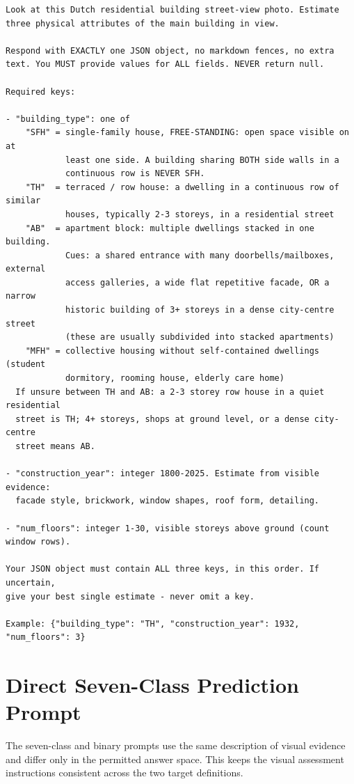 \begin{lstlisting}[keywords={},mathescape=false,basicstyle=\ttfamily\footnotesize,breaklines=true]
Look at this Dutch residential building street-view photo. Estimate three physical attributes of the main building in view.

Respond with EXACTLY one JSON object, no markdown fences, no extra text. You MUST provide values for ALL fields. NEVER return null.

Required keys:

- "building_type": one of
    "SFH" = single-family house, FREE-STANDING: open space visible on at
            least one side. A building sharing BOTH side walls in a
            continuous row is NEVER SFH.
    "TH"  = terraced / row house: a dwelling in a continuous row of similar
            houses, typically 2-3 storeys, in a residential street
    "AB"  = apartment block: multiple dwellings stacked in one building.
            Cues: a shared entrance with many doorbells/mailboxes, external
            access galleries, a wide flat repetitive facade, OR a narrow
            historic building of 3+ storeys in a dense city-centre street
            (these are usually subdivided into stacked apartments)
    "MFH" = collective housing without self-contained dwellings (student
            dormitory, rooming house, elderly care home)
  If unsure between TH and AB: a 2-3 storey row house in a quiet residential
  street is TH; 4+ storeys, shops at ground level, or a dense city-centre
  street means AB.

- "construction_year": integer 1800-2025. Estimate from visible evidence:
  facade style, brickwork, window shapes, roof form, detailing.

- "num_floors": integer 1-30, visible storeys above ground (count window rows).

Your JSON object must contain ALL three keys, in this order. If uncertain,
give your best single estimate - never omit a key.

Example: {"building_type": "TH", "construction_year": 1932, "num_floors": 3}
\end{lstlisting}

\section{Direct Seven-Class Prediction Prompt}
\label{sec:appendix_d_sevenclass_prompt}

The seven-class and binary prompts use the same description of visual evidence and differ only in the permitted answer space.
This keeps the visual assessment instructions consistent across the two target definitions.

